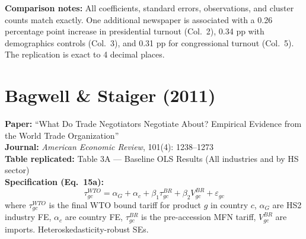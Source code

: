 \documentclass[11pt,a4paper]{article}
\begin{document}
\vspace{1cm}
\textbf{Comparison notes:} All coefficients, standard errors, observations, and cluster counts match exactly. One additional newspaper is associated with a 0.26 percentage point increase in presidential turnout (Col.\ 2), 0.34 pp with demographics controls (Col.\ 3), and 0.31 pp for congressional turnout (Col.\ 5). The replication is exact to 4 decimal places.

\newpage

\section{Bagwell \& Staiger (2011)}

\textbf{Paper:} ``What Do Trade Negotiators Negotiate About? Empirical Evidence from the World Trade Organization''\\
\textbf{Journal:} \textit{American Economic Review}, 101(4): 1238--1273\\
\textbf{Table replicated:} Table 3A --- Baseline OLS Results (All industries and by HS sector)\\
\textbf{Specification (Eq.\ 15a):}
\[
\tau_{gc}^{WTO} = \alpha_G + \alpha_c + \beta_1 \tau_{gc}^{BR} + \beta_2 V_{gc}^{BR} + \varepsilon_{gc}
\]
where $\tau_{gc}^{WTO}$ is the final WTO bound tariff for product $g$ in country $c$, $\alpha_G$ are HS2 industry FE, $\alpha_c$ are country FE, $\tau_{gc}^{BR}$ is the pre-accession MFN tariff, $V_{gc}^{BR}$ are imports. Heteroskedasticity-robust SEs.

\vspace{0.3cm}
\noindent{}
\end{document}
